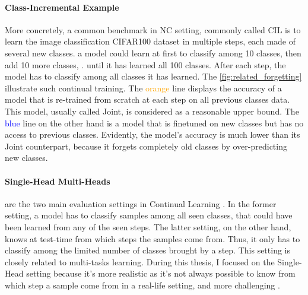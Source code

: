 \paragraph{Class-Incremental Example} More concretely, a common benchmark in \ac{NC} setting,
commonly called \ac{CIL} is to learn the image classification CIFAR100 dataset
\citep{krizhevskycifar100} in multiple steps, each made of several new classes. \eg a model could
learn at first to classify among 10 classes, then add 10 more classes, \etc. until it has learned
all 100 classes. After each step, the model has to classify among all classes it has learned. The
\autoref{fig:related_forgetting} illustrate such continual training. The \textcolor{orange}{orange}
line displays the accuracy of a model that is re-trained from scratch at each step on all previous
classes data. This model, usually called Joint, is considered as a reasonable upper bound. The
\textcolor{blue}{blue} line on the other hand is a model that is finetuned on new classes but has no
access to previous classes. Evidently, the model's accuracy is much lower than its Joint
counterpart, because it forgets completely old classes by over-predicting new classes.

\paragraph{Single-Head \vs Multi-Heads} are the two main evaluation settings in Continual Learning
\citep{chaudhry2018riemannien_walk}. In the former setting, a model has to classify samples among
all seen classes, that could have been learned from any of the seen steps. The latter setting, on
the other hand, knows at test-time from which steps the samples come from. Thus, it only has to
classify among the limited number of classes brought by a step. This setting is closely related to
multi-tasks learning. During this thesis, I focused on the Single-Head setting because it's more
realistic as it's not always possible to know from which step a sample come from in a real-life
setting, and more challenging \citep{lesort2019regulshortcomings}.


